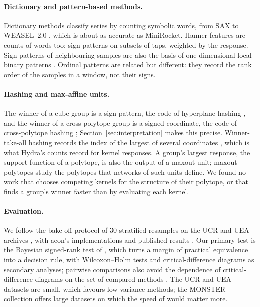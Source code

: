 \paragraph{Dictionary and pattern-based methods.} Dictionary methods classify series by
counting symbolic words, from SAX \citep{lin2007sax} to WEASEL~2.0
\citep{schaefer2023weasel2}, which is about as accurate as MiniRocket. Hanner features are
counts of words too: sign patterns on subsets of taps, weighted by the response. Sign
patterns of neighbouring samples are also the basis of one-dimensional local binary
patterns \citep{kaya2014lbp}. Ordinal patterns \citep{bandt2002permutation} are related but
different: they record the rank order of the samples in a window, not their signs.

\paragraph{Hashing and max-affine units.} The winner of a cube group is a sign pattern, the
code of hyperplane hashing \citep{charikar2002simhash}, and the winner of a cross-polytope
group is a signed coordinate, the code of cross-polytope hashing
\citep{andoni2015crosspolytope}; Section~\ref{sec:interpretation} makes this precise.
Winner-take-all hashing records the index of the largest of several coordinates
\citep{yagnik2011wta}, which is what Hydra's counts record for kernel responses. A group's
largest response, the support function of a polytope, is also the output of a maxout unit;
maxout polytopes \citep{balakin2025maxout} study the polytopes that networks of such units
define. We found no work that chooses competing kernels for the structure of their
polytope, or that finds a group's winner faster than by evaluating each kernel.

\paragraph{Evaluation.} We follow the bake-off protocol of 30 stratified resamples
\citep{ruiz2021multivariate,middlehurst2024bakeoff} on the UCR and UEA archives
\citep{dau2019ucr,bagnall2018uea}, with aeon's implementations and published results
\citep{middlehurst2024aeon}. Our primary test is the Bayesian signed-rank test of
\citet{benavoli2017bayesian}, which turns a margin of practical equivalence into a decision
rule, with Wilcoxon--Holm tests and critical-difference diagrams
\citep{demsar2006statistical} as secondary analyses; pairwise comparisons also avoid the
dependence of critical-difference diagrams on the set of compared methods
\citep{ismailfawaz2023mcm}. The UCR and UEA datasets are small, which favours
low-variance methods; the MONSTER collection \citep{dempster2025monster} offers large
datasets on which the speed of \hh{} would matter more.
